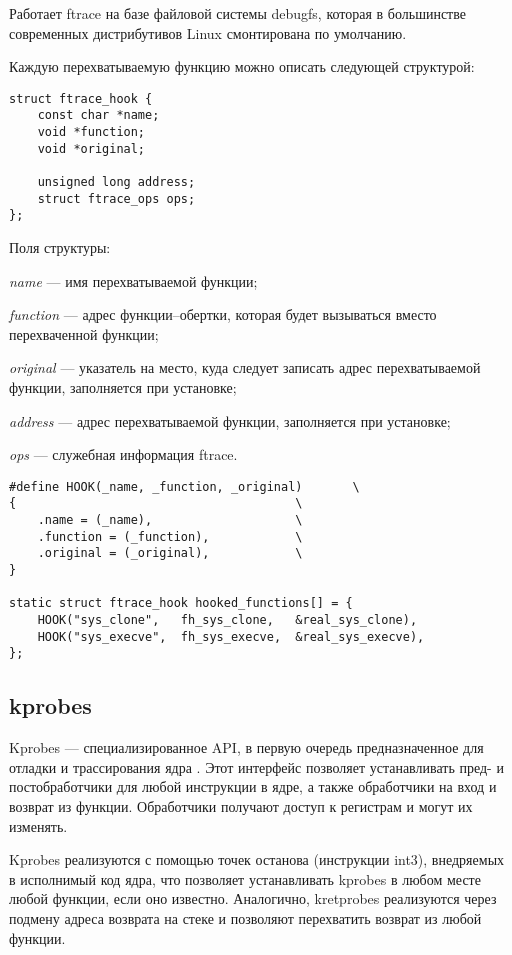 Работает ftrace на базе файловой системы debugfs, которая в большинстве современных дистрибутивов Linux смонтирована по умолчанию. 

Каждую перехватываемую функцию можно описать следующей структурой:

\begin{lstlisting}[label=code:ftracehook,caption=Структура ftrace\_hook]
struct ftrace_hook {
	const char *name;
	void *function;
	void *original;
	
	unsigned long address;
	struct ftrace_ops ops;
};
\end{lstlisting}

Поля структуры:

\textit{name} --- имя перехватываемой функции;

\textit{function} ---  адрес функции--обертки, которая будет вызываться вместо перехваченной функции;

\textit{original} ---  указатель на место, куда следует записать адрес перехватываемой функции, заполняется при установке;

\textit{address} --- адрес перехватываемой функции, заполняется при установке;

\textit{ops} --- служебная информация ftrace.

\begin{lstlisting}[label=code:ftracehookexm,caption=Пример заполнения структуры ftrace\_hook]
#define HOOK(_name, _function, _original)       \
{                                       \
	.name = (_name),                    \
	.function = (_function),            \
	.original = (_original),            \
}
	
static struct ftrace_hook hooked_functions[] = {
	HOOK("sys_clone",   fh_sys_clone,   &real_sys_clone),
	HOOK("sys_execve",  fh_sys_execve,  &real_sys_execve),
};
\end{lstlisting}

\subsection{kprobes}

Kprobes --- специализированное API, в первую очередь предназначенное для отладки и трассирования ядра \cite{stiven}. Этот интерфейс позволяет устанавливать пред- и постобработчики для любой инструкции в ядре, а также обработчики на вход и возврат из функции. Обработчики получают доступ к регистрам и могут их изменять.

Kprobes реализуются с помощью точек останова (инструкции int3), внедряемых в исполнимый код ядра, что позволяет устанавливать kprobes в любом месте любой функции, если оно известно. Аналогично, kretprobes реализуются через подмену адреса возврата на стеке и позволяют перехватить возврат из любой функции.

